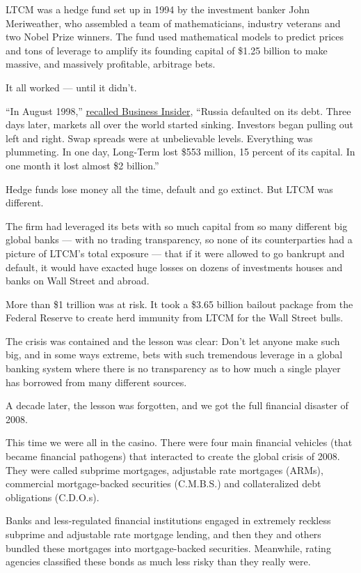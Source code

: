 LTCM was a hedge fund set up in 1994 by the investment banker John
Meriweather, who assembled a team of mathematicians, industry veterans
and two Nobel Prize winners. The fund used mathematical models to
predict prices and tons of leverage to amplify its founding capital of
\$1.25 billion to make massive, and massively profitable, arbitrage
bets.

It all worked --- until it didn't.

``In August 1998,''
\href{https://www.businessinsider.com/the-fall-of-long-term-capital-management-2014-7}{recalled
Business Insider}, ``Russia defaulted on its debt. Three days later,
markets all over the world started sinking. Investors began pulling out
left and right. Swap spreads were at unbelievable levels. Everything was
plummeting. In one day, Long-Term lost \$553 million, 15 percent of its
capital. In one month it lost almost \$2 billion.''

Hedge funds lose money all the time, default and go extinct. But LTCM
was different.

The firm had leveraged its bets with so much capital from so many
different big global banks --- with no trading transparency, so none of
its counterparties had a picture of LTCM's total exposure --- that if it
were allowed to go bankrupt and default, it would have exacted huge
losses on dozens of investments houses and banks on Wall Street and
abroad.

More than \$1 trillion was at risk. It took a \$3.65 billion bailout
package from the Federal Reserve to create herd immunity from LTCM for
the Wall Street bulls.

The crisis was contained and the lesson was clear: Don't let anyone make
such big, and in some ways extreme, bets with such tremendous leverage
in a global banking system where there is no transparency as to how much
a single player has borrowed from many different sources.

A decade later, the lesson was forgotten, and we got the full financial
disaster of 2008.

This time we were all in the casino. There were four main financial
vehicles (that became financial pathogens) that interacted to create the
global crisis of 2008. They were called subprime mortgages, adjustable
rate mortgages (ARMs), commercial mortgage-backed securities (C.M.B.S.)
and collateralized debt obligations (C.D.O.s).

Banks and less-regulated financial institutions engaged in extremely
reckless subprime and adjustable rate mortgage lending, and then they
and others bundled these mortgages into mortgage-backed securities.
Meanwhile, rating agencies classified these bonds as much less risky
than they really were.

